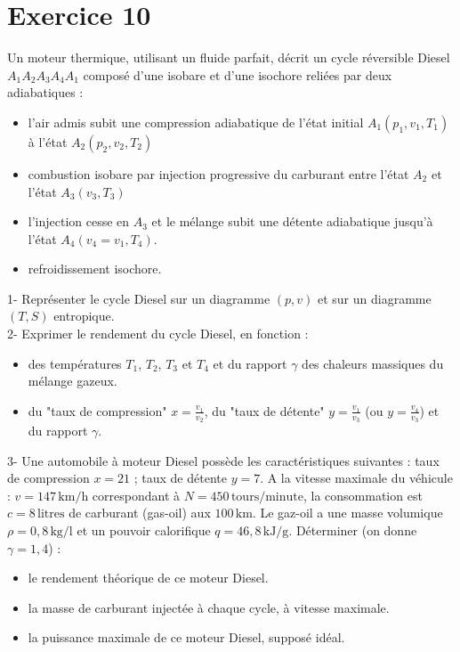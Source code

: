 \documentclass[a4paper,12pt]{article}
\begin{document}
	\section*{Exercice 10}
	Un moteur thermique, utilisant un fluide parfait, décrit un cycle réversible Diesel $A_1A_2A_3A_4A_1$ composé d'une isobare et d'une isochore reliées par deux adiabatiques :
	\begin{itemize}
		\item[$A_1A_2$ :] l'air admis subit une compression adiabatique de l'état initial $A_1(p_1, v_1, T_1)$ à l'état $A_2(p_2, v_2, T_2)$
		\item[$A_2A_3$ :] combustion isobare par injection progressive du carburant entre l'état $A_2$ et l'état $A_3(v_3, T_3)$
		\item[$A_3A_4$ :] l'injection cesse en $A_3$ et le mélange subit une détente adiabatique jusqu'à l'état $A_4(v_4=v_1, T_4)$.
		\item[$A_4A_1$ :] refroidissement isochore.
	\end{itemize}
	
	1- Représenter le cycle Diesel sur un diagramme $(p, v)$ et sur un diagramme $(T, S)$ entropique.\\
	2- Exprimer le rendement du cycle Diesel, en fonction :
	\begin{itemize}
		\item[a)] des températures $T_1$, $T_2$, $T_3$ et $T_4$ et du rapport $\gamma$ des chaleurs massiques du mélange gazeux.
		\item[b)] du "taux de compression" $x = \frac{v_1}{v_2}$, du "taux de détente" $y = \frac{v_1}{v_3}$ (ou $y = \frac{v_4}{v_3}$) et du rapport $\gamma$.
	\end{itemize}
	3- Une automobile à moteur Diesel possède les caractéristiques suivantes : taux de compression $x=21$ ; taux de détente $y=7$. A la vitesse maximale du véhicule : $v = 147\,\text{km/h}$ correspondant à $N = 450\,\text{tours/minute}$, la consommation est $c = 8\,\text{litres}$ de carburant (gas-oil) aux $100\,\text{km}$. Le gaz-oil a une masse volumique $\rho = 0{,}8\,\text{kg/l}$ et un pouvoir calorifique $q = 46{,}8\,\text{kJ/g}$. Déterminer (on donne $\gamma = 1{,}4$) :
	\begin{itemize}
		\item[a)] le rendement théorique de ce moteur Diesel.
		\item[b)] la masse de carburant injectée à chaque cycle, à vitesse maximale.
		\item[c)] la puissance maximale de ce moteur Diesel, supposé idéal.
	\end{itemize}
	
\end{document}
